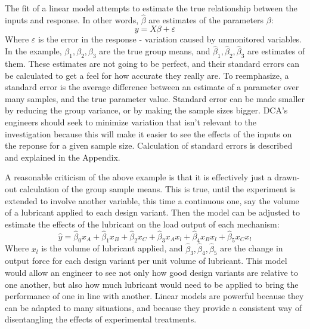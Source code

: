 \documentclass[11pt,a4paper,article]{memoir} %
\begin{document}
The fit of a linear model attempts to estimate the true relationship between the inputs and response. In other words, $\hat{\beta}$ are estimates of the parameters $\beta$:
\begin{equation}
	y = X\beta + \varepsilon
\end{equation}
Where $\varepsilon$ is the error in the response - variation caused by unmonitored variables. In the example, $\beta_1, \beta_2, \beta_3$ are the true group means, and $\hat{\beta}_1, \hat{\beta}_2, \hat{\beta}_3$ are estimates of them. These estimates are not going to be perfect, and their standard errors can be calculated to get a feel for how accurate they really are. To reemphasize, a standard error is the average difference between an estimate of a parameter over many samples, and the true parameter value. Standard error can be made smaller by reducing the group variance, or by making the sample sizes bigger.  DCA's engineers should seek to minimize variation that isn't relevant to the investigation because this will make it easier to see the effects of the inputs on the reponse for a given sample size. Calculation of standard errors is described and explained in the Appendix.

A reasonable criticism of the above example is that it is effectively just a drawn-out calculation of the group sample means. This is true, until the experiment is extended to involve another variable, this time a continuous one, say the volume of a lubricant applied to each design variant. Then the model can be adjusted to estimate the effects of the lubricant on the load output of each mechanism:
\begin{equation}
	\hat{y} = \hat{\beta}_0 x_A + \hat{\beta}_{1}x_B + \hat{\beta}_{2}x_C + \hat{\beta}_3 x_A x_l + \hat{\beta}_4 x_B x_l + \hat{\beta}_5 x_C x_l
\end{equation}
Where $x_l$ is the volume of lubricant applied, and $\hat{\beta}_3, \hat{\beta}_4, \hat{\beta}_5$ are the change in output force for each design variant per unit volume of lubricant. This model would allow an engineer to see not only how good design variants are relative to one another, but also how much lubricant would need to be applied to bring the performance of one in line with another. Linear models are powerful because they can be adapted to many situations, and because they provide a consistent way of disentangling the effects of experimental treatments.
\end{document}
